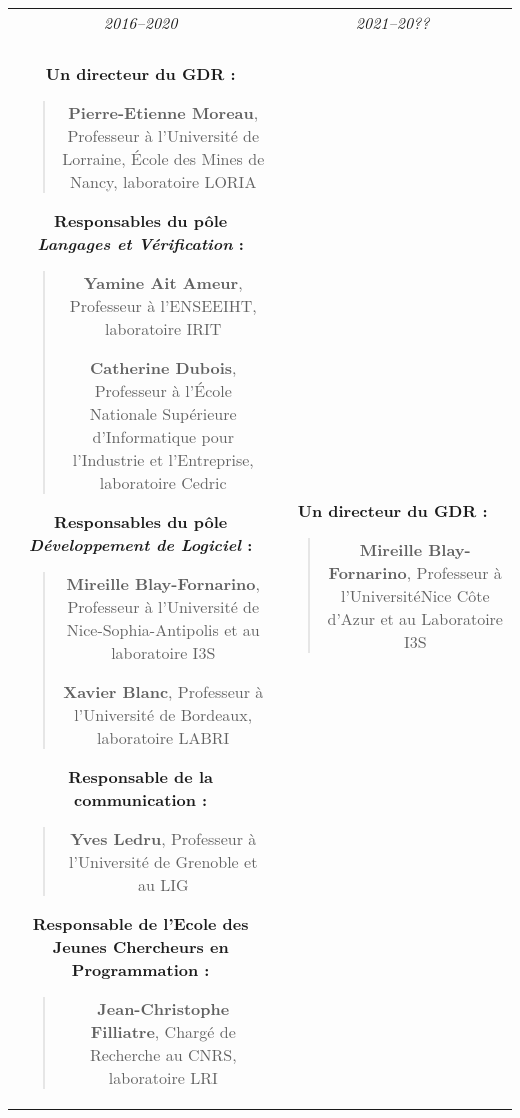 \documentclass[11pt]{article}
\begin{document}
\begin{small}
\begin{center}
\begin{tabular}{c|c}
  \textit{2016--2020} & \textit{2021--20??}\\
  \\

\hspace*{0.2cm}
\begin{minipage}[t]{.5\textwidth}
  \textbf{Un directeur du GDR :}
  \begin{quote}
    \textbf{Pierre-Etienne Moreau},
  Professeur à l'Université de Lorraine, École des
        Mines de Nancy, laboratoire LORIA
  \end{quote}
  \textbf{Responsables du pôle \textit{Langages et Vérification} :}
  \begin{quote}
    \textbf{Yamine Ait Ameur}, Professeur à l'ENSEEIHT, laboratoire IRIT

    \textbf{Catherine Dubois}, Professeur à l'École Nationale Supérieure d'Informatique pour l'Industrie et l'Entreprise, laboratoire Cedric
  \end{quote}

  \textbf{Responsables du pôle \textit{Développement de Logiciel} :}
  \begin{quote}
    \textbf{Mireille Blay-Fornarino}, Professeur à l'Université de Nice-Sophia-Antipolis et au laboratoire I3S

    \textbf{Xavier Blanc}, Professeur à l'Université de Bordeaux, laboratoire LABRI
\end{quote}

\textbf{Responsable de la communication :}
\begin{quote}
  \textbf{Yves Ledru}, Professeur à l'Université de Grenoble et au LIG
\end{quote}

\textbf{Responsable de l'Ecole des Jeunes Chercheurs en Programmation :}
\begin{quote}
  \textbf{Jean-Christophe Filliatre}, Chargé de Recherche au CNRS, laboratoire LRI
\end{quote}
\end{minipage}
&
\begin{minipage}[t]{.5\textwidth}
  \textbf{Un directeur du GDR :}
  \begin{quote}
    \textbf{Mireille Blay-Fornarino}, Professeur à l'UniversitéNice Côte d'Azur et au Laboratoire I3S
  \end{quote}


\end{minipage}
\end{tabular}
\end{center}
\end{small}
\end{document}
